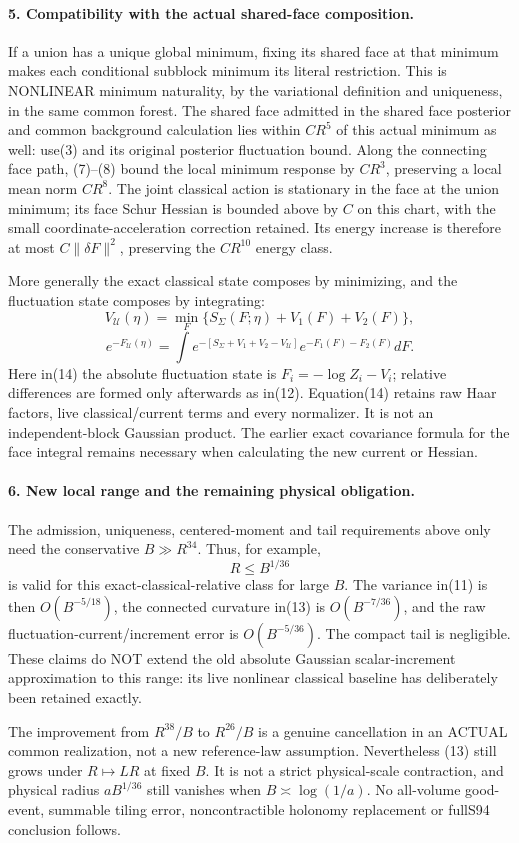 \documentclass[11pt]{article}
\begin{document}
\paragraph{5. Compatibility with the actual shared-face composition.}
If a union has a unique global minimum, fixing its shared face at that
minimum makes each conditional subblock minimum its literal restriction.
This is NONLINEAR minimum naturality, by the variational definition and
uniqueness, in the same common forest. The shared face admitted in the shared face posterior and common background calculation
lies within $CR^5$ of this actual minimum as well: use(3) and its original
posterior fluctuation bound. Along the connecting face path, (7)--(8) bound
the local minimum response by $CR^3$, preserving a local mean norm $CR^8$.
The joint classical action is stationary in the face at the union minimum;
its face Schur Hessian is bounded above by $C$ on this chart, with the small
coordinate-acceleration correction retained. Its energy increase is therefore
at most $C\|\delta F\|^2$, preserving the $CR^{10}$ energy class.

More generally the exact classical state composes by minimizing, and the
fluctuation state composes by integrating:
\[
 V_{\mathcal U}(\eta)=\min_F\{S_\Sigma(F;\eta)+V_1(F)+V_2(F)\},
\]
\[
 e^{-F_{\mathcal U}(\eta)}=
 \int e^{-[S_\Sigma+V_1+V_2-V_{\mathcal U}]}e^{-F_1(F)-F_2(F)}dF.         \tag{14}
\]
Here in(14) the absolute fluctuation state is $F_i=-\log Z_i-V_i$;
relative differences are formed only afterwards as in(12).
Equation(14) retains raw Haar factors, live classical/current terms and every
normalizer. It is not an independent-block Gaussian product. The earlier
exact covariance formula for the face integral remains necessary when
calculating the new current or Hessian.

\paragraph{6. New local range and the remaining physical obligation.}
The admission, uniqueness, centered-moment and tail requirements above only
need the conservative $B\gg R^{34}$. Thus, for example,
\[
 R\le B^{1/36}                                                        \tag{15}
\]
is valid for this exact-classical-relative class for large $B$.
The variance in(11) is then $O(B^{-5/18})$, the connected curvature in(13)
is $O(B^{-7/36})$, and the raw fluctuation-current/increment error is
$O(B^{-5/36})$. The compact tail is negligible. These claims do NOT extend
the old absolute Gaussian scalar-increment approximation to this range:
its live nonlinear classical baseline has deliberately been retained exactly.

The improvement from $R^{38}/B$ to $R^{26}/B$ is a genuine cancellation in an
ACTUAL common realization, not a new reference-law assumption. Nevertheless
(13) still grows under $R\mapsto LR$ at fixed $B$. It is not a strict
physical-scale contraction, and physical radius $aB^{1/36}$ still vanishes
when $B\asymp\log(1/a)$. No all-volume good-event, summable tiling error,
noncontractible holonomy replacement or fullS94 conclusion follows.
\end{document}
